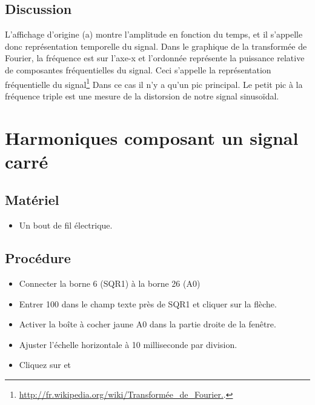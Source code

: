 \documentclass{book}
\begin{document}
\subsection{Discussion}


L'affichage d'origine (a) montre l'amplitude en fonction du temps, et il s'appelle donc représentation temporelle du signal. Dans le graphique de la transformée de Fourier, la fréquence est sur l'axe-x et l'ordonnée représente la puissance relative de composantes fréquentielles du signal. Ceci s'appelle la représentation fréquentielle du signal\footnote{\href{http://fr.wikipedia.org/wiki/Transformée\_de\_Fourier}{\mbox{http://fr.wikipedia.org/wiki/Transformée\_de\_Fourier}.}. } Dans ce cas il n'y a qu'un pic principal. Le petit pic à la fréquence triple est une mesure de la distorsion de notre signal sinusoïdal.










\section{Harmoniques composant un signal carré}









\subsection{Matériel}


\begin{itemize}
  \item Un bout de fil électrique.
\end{itemize}

\subsection{Procédure}


\begin{itemize}
  \item Connecter la borne 6 (SQR1) à la borne 26 (A0)
  \item Entrer 100 dans le champ texte près de SQR1 et cliquer sur la flèche.
  \item Activer la boîte à cocher jaune A0 dans la partie droite de la fenêtre.
  \item Ajuster l'échelle horizontale à 10 milliseconde par division.
  \item Cliquez sur   et  
\end{itemize}
\end{document}
